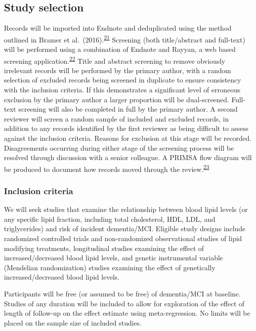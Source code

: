 \documentclass[a4paper, twoside]{templates/ociamthesis}
\begin{document}
\hypertarget{study-selection}{%
\subsection{Study selection}\label{study-selection}}

Records will be imported into Endnote and deduplicated using the method outlined in Bramer et al.~(2016).\textsuperscript{\protect\hyperlink{ref-bramer2016}{21}} Screening (both title/abstract and full-text) will be performed using a combination of Endnote and Rayyan, a web based screening application.\textsuperscript{\protect\hyperlink{ref-ouzzani2016}{22}}
Title and abstract screening to remove obviously irrelevant records will be performed by the primary author, with a random selection of excluded records being screened in duplicate to ensure consistency with the inclusion criteria. If this demonstrates a significant level of erroneous exclusion by the primary author a larger proportion will be dual-screened.
Full-text screening will also be completed in full by the primary author. A second reviewer will screen a random sample of included and excluded records, in addition to any records identified by the first reviewer as being difficult to assess against the inclusion criteria. Reasons for exclusion at this stage will be recorded. Disagreements occurring during either stage of the screening process will be resolved through discussion with a senior colleague. A PRIMSA flow diagram will be produced to document how records moved through the review.\textsuperscript{\protect\hyperlink{ref-zotero-766}{23}}

\hypertarget{inclusion-criteria}{%
\subsubsection{Inclusion criteria}\label{inclusion-criteria}}

We will seek studies that examine the relationship between blood lipid levels (or any specific lipid fraction, including total cholesterol, HDL, LDL, and triglycerides) and risk of incident dementia/MCI. Eligible study designs include randomized controlled trials and non-randomized observational studies of lipid modifying treatments, longitudinal studies examining the effect of increased/decreased blood lipid levels, and genetic instrumental variable (Mendelian randomization) studies examining the effect of genetically increased/decreased blood lipid levels.

Participants will be free (or assumed to be free) of dementia/MCI at baseline. Studies of any duration will be included to allow for exploration of the effect of length of follow-up on the effect estimate using meta-regression. No limits will be placed on the sample size of included studies.
\end{document}

